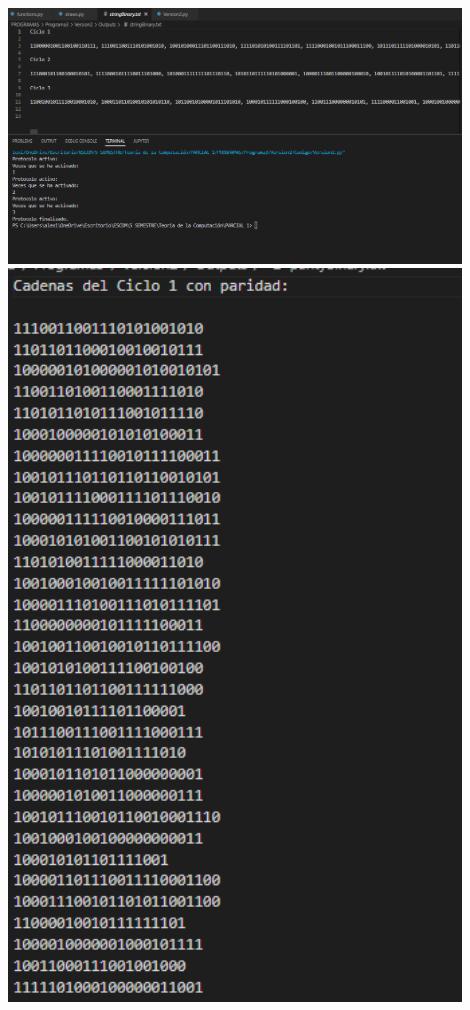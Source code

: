\documentclass{article}
\begin{document}
\begin{center}
    \includegraphics[width = 12cm]{test1.PNG}
    \newline\newline
    \includegraphics[width = 12cm]{Paridad.PNG}

\end{center}
\end{document}

